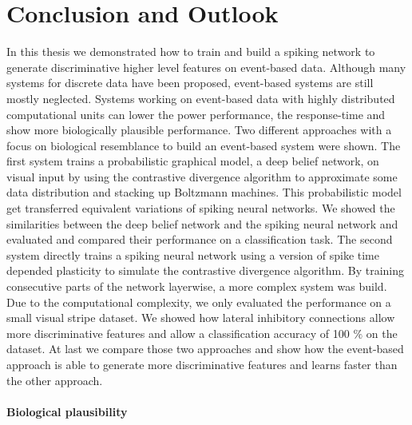 \chapter{Conclusion and Outlook}

In this thesis we demonstrated how to train and build a spiking network to generate discriminative higher level features on event-based data.
Although many systems for discrete data have been proposed, event-based systems are still mostly neglected.
Systems working on event-based data with highly distributed computational units can lower the power performance, the response-time and show more biologically plausible performance.  
Two different approaches with a focus on biological resemblance to build an event-based system were shown.
The first system trains a probabilistic graphical model, a deep belief network, on visual input by using the contrastive divergence algorithm to approximate some data distribution and stacking up Boltzmann machines.
This probabilistic model get transferred equivalent variations of spiking neural networks.
We showed the similarities between the deep belief network and the spiking neural network and evaluated and compared their performance on a classification task.   
The second system directly trains a spiking neural network using a version of spike time depended plasticity to simulate the contrastive divergence algorithm. By training consecutive parts of the network layerwise, a more complex system was build. Due to the computational complexity, we only evaluated the performance on a small visual stripe dataset. We showed how lateral inhibitory connections allow more discriminative features and allow a classification accuracy of 100 $\%$ on the dataset.
At last we compare those two approaches and show how the event-based approach is able to generate more discriminative features and learns faster than the other approach.  

\subsubsection{Biological plausibility}


